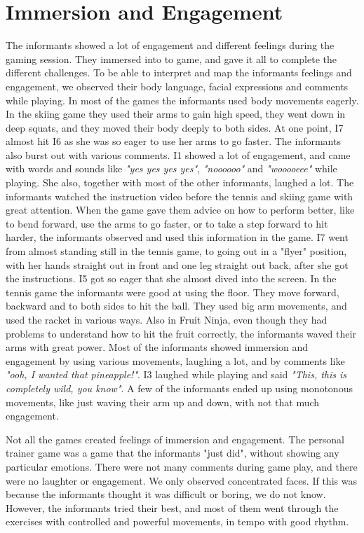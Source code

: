 \section{Immersion and Engagement}
The informants showed a lot of engagement and different feelings during the gaming session. They immersed into to game, and gave it all to complete the different challenges. To be able to interpret and map the informants feelings and engagement, we observed their body language, facial expressions and comments while playing. In most of the games the informants used body movements eagerly. In the skiing game they used their arms to gain high speed, they went down in deep squats, and they moved their body deeply to both sides. At one point, I7 almost hit I6 as she was so eager to use her arms to go faster. The informants also burst out with various comments. I1 showed a lot of engagement, and came with words and sounds like \emph{"yes yes yes yes"}, \emph{"noooooo"} and \emph{"wooooeee"} while playing. She also, together with most of the other informants, laughed a lot. The informants watched the instruction video before the tennis and skiing game with great attention. When the game gave them advice on how to perform better, like to bend forward, use the arms to go faster, or to take a step forward to hit harder, the informants observed and used this information in the game. I7 went from almost standing still in the tennis game, to going out in a "flyer" position, with her hands straight out in front and one leg straight out back, after she got the instructions. I5 got so eager that she almost dived into the screen. In the tennis game the informants were good at using the floor. They move forward, backward and to both sides to hit the ball. They used big arm movements, and used the racket in various ways. Also in Fruit Ninja, even though they had problems to understand how to hit the fruit correctly, the informants waved their arms with great power. Most of the informants showed immersion and engagement by using various movements, laughing a lot, and by comments like \emph{"ooh, I wanted that pineapple!"}. I3 laughed while playing and said \emph{"This, this is completely wild, you know"}. A few of the informants ended up using monotonous movements, like just waving their arm up and down, with not that much engagement. 

Not all the games created feelings of immersion and engagement. The personal trainer game was a game that the informants "just did", without showing any particular emotions. There were not many comments during game play, and there were no laughter or engagement. We only observed concentrated faces. If this was because the informants thought it was difficult or boring, we do not know. However, the informants tried their best, and most of them went through the exercises with controlled and powerful movements, in tempo with good rhythm.       

